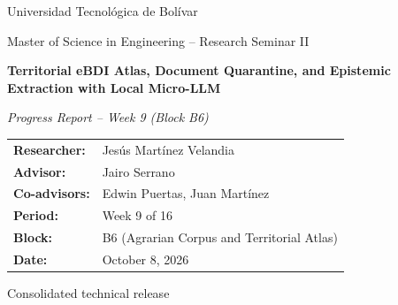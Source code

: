 \documentclass[11pt,a4paper]{article}
\begin{document}
\begin{titlepage}
    \thispagestyle{empty}
    \centering
    \vspace*{1.5cm}

    {\large Universidad Tecnológica de Bolívar\par}
    \vspace{0.3cm}
    {\normalsize Master of Science in Engineering -- Research Seminar II\par}

    \vspace{2.2cm}
    {\LARGE\bfseries Territorial eBDI Atlas, Document Quarantine, and Epistemic Extraction with Local Micro-LLM\par}

    \vspace{0.8cm}
    {\large\itshape Progress Report -- Week 9 (Block B6)\par}

    \vspace{2.5cm}
    \begin{tabular}{ll}
        \textbf{Researcher:} & Jesús Martínez Velandia \\
        \textbf{Advisor:} & Jairo Serrano \\
        \textbf{Co-advisors:} & Edwin Puertas, Juan Martínez \\
        \textbf{Period:} & Week 9 of 16 \\
        \textbf{Block:} & B6 (Agrarian Corpus and Territorial Atlas) \\
        \textbf{Date:} & October 8, 2026 \\
    \end{tabular}

    \vfill
    {\small Consolidated technical release\par}
    \vspace*{1.0cm}
\end{titlepage}

\newpage
{}
\fancyfoot[C]{\small \thepage}
\tableofcontents
\newpage

\setcounter{page}{1}
\end{document}
